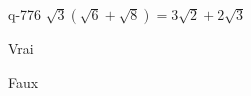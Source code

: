 \begin{truefalse}{q-776}
$\sqrt{3}(\sqrt{6}+\sqrt{8})=3\sqrt{2}+2\sqrt{3}$
\item Vrai
\item* Faux
\end{truefalse}

